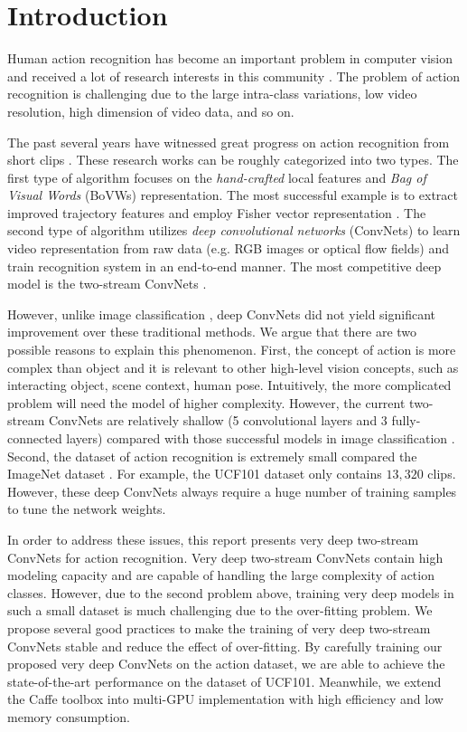 \documentclass[10pt,twocolumn,letterpaper]{article}
\begin{document}
\section{Introduction}
Human action recognition has become an important problem in computer vision and received a lot of research interests in this community \cite{SimonyanZ14,WangS13a,WangQT15a}. The problem of action recognition is challenging due to the large intra-class variations, low video resolution, high dimension of video data, and so on.

The past several years have witnessed great progress on action recognition from short clips \cite{Lan15,Ng15,SimonyanZ14,WangS13a,WangQT13b,WangQT13a,WangQT15a}. These research works can be roughly categorized into two types. The first type of algorithm focuses on the \emph{hand-crafted} local features and \emph{Bag of Visual Words} (BoVWs) representation. The most successful example is to extract improved trajectory features \cite{WangS13a} and employ Fisher vector representation \cite{SanchezPMV13}. The second type of algorithm utilizes \emph{deep convolutional networks} (ConvNets) to learn video representation from raw data (e.g. RGB images or optical flow fields) and train recognition system in an end-to-end manner. The most competitive deep model is the two-stream ConvNets \cite{SimonyanZ14}.

However, unlike image classification \cite{KrizhevskySH12}, deep ConvNets did not yield significant improvement over these traditional methods. We argue that there are two possible reasons to explain this phenomenon. First, the concept of action is more complex than object and it is relevant to other high-level vision concepts, such as interacting object, scene context, human pose. Intuitively, the more complicated problem will need the model of higher complexity. However, the current two-stream ConvNets are relatively shallow (5 convolutional layers and 3 fully-connected layers) compared with those successful models in image classification \cite{SimonyanZ14a,SzegedyLJSRAEVR14}. Second, the dataset of action recognition is extremely small compared the ImageNet dataset \cite{DengDSLL009}. For example, the UCF101 dataset \cite{Soomro12} only contains $13,320$ clips. However, these deep ConvNets always require a huge number of training samples to tune the network weights.

In order to address these issues, this report presents very deep two-stream ConvNets for action recognition. Very deep two-stream ConvNets contain high modeling capacity and are capable of handling the large complexity of action classes. However, due to the second problem above, training very deep models in such a small dataset is much challenging due to the over-fitting problem. We propose several good practices to make the training of very deep two-stream ConvNets stable and reduce the effect of over-fitting. By carefully training our proposed very deep ConvNets on the action dataset, we are able to achieve the state-of-the-art performance on the dataset of UCF101. Meanwhile, we extend the Caffe toolbox \cite{JiaSDKLGGD14} into multi-GPU implementation with high efficiency and low memory consumption. 
\end{document}
